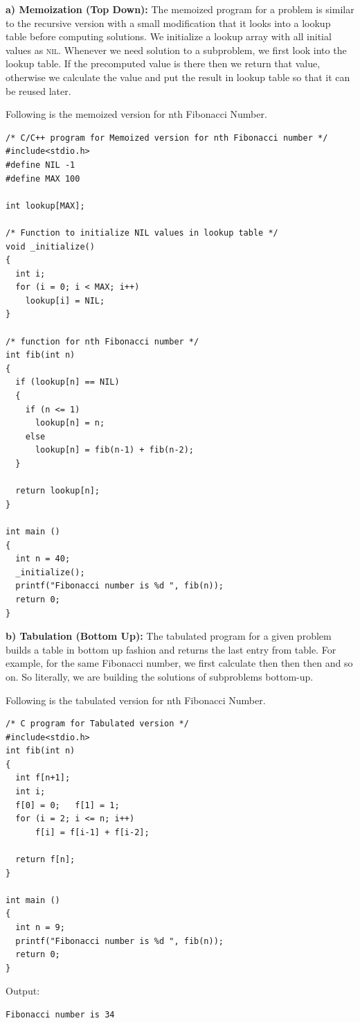 \textbf{a) Memoization (Top Down):} The memoized program for a problem is
similar to the recursive version with a small modification that it looks
into a lookup table before computing solutions. We initialize a lookup array
with all initial values as \textsc{nil}. Whenever we need solution to a
subproblem, we first look into the lookup table. If the precomputed value is
there then we return that value, otherwise we calculate the value and put
the result in lookup table so that it can be reused later.

Following is the memoized version for nth Fibonacci Number.
\begin{lstlisting}[style=raycppnewsnippet]
/* C/C++ program for Memoized version for nth Fibonacci number */
#include<stdio.h>
#define NIL -1
#define MAX 100
 
int lookup[MAX];
 
/* Function to initialize NIL values in lookup table */
void _initialize()
{
  int i;
  for (i = 0; i < MAX; i++)
    lookup[i] = NIL;
}
 
/* function for nth Fibonacci number */
int fib(int n)
{
  if (lookup[n] == NIL)
  {
    if (n <= 1)
      lookup[n] = n;
    else
      lookup[n] = fib(n-1) + fib(n-2);
  }
 
  return lookup[n];
}
 
int main ()
{
  int n = 40;
  _initialize();
  printf("Fibonacci number is %d ", fib(n));
  return 0;
}
\end{lstlisting}

\textbf{b) Tabulation (Bottom Up):} The tabulated program for a given
problem builds a table in bottom up fashion and returns the last entry from
table. For example, for the same Fibonacci number, we first calculate
 then  then  then  and so
on. So literally, we are building the solutions of subproblems bottom-up.

Following is the tabulated version for nth Fibonacci Number.
\begin{lstlisting}[style=raycppnewsnippet]
/* C program for Tabulated version */
#include<stdio.h>
int fib(int n)
{
  int f[n+1];
  int i;
  f[0] = 0;   f[1] = 1; 
  for (i = 2; i <= n; i++)
      f[i] = f[i-1] + f[i-2];
 
  return f[n];
}
  
int main ()
{
  int n = 9;
  printf("Fibonacci number is %d ", fib(n));
  return 0;
}
\end{lstlisting}
Output:
\begin{lstlisting}[style=rayio]
Fibonacci number is 34 
\end{lstlisting}

